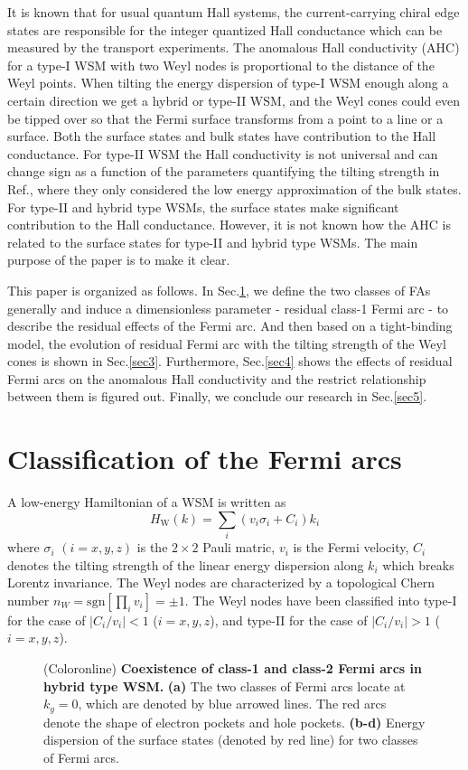 \documentclass[twocolumn,superscriptaddress]{revtex4}%
\begin{document}
It is known that for usual quantum Hall systems, the current-carrying chiral
edge states are responsible for the integer quantized Hall conductance which
can be measured by the transport experiments\cite{Halperin1982,Streda1984}. The
anomalous Hall conductivity (AHC) for a type-I WSM with two Weyl nodes is
proportional to the distance of the Weyl points\cite{RanY2011}. When tilting
the energy dispersion of type-I WSM enough along a certain direction we get a hybrid or type-II WSM, and the Weyl cones could even be tipped over so that the Fermi surface
transforms from a point to a line or a surface. Both the surface states and
bulk states have contribution to the Hall conductance. For type-II WSM the Hall conductivity is not universal and can change
sign as a function of the parameters quantifying the tilting strength in
Ref.\cite{typeII2016}, where they only considered the low energy approximation
of the bulk states. For type-II and hybrid type WSMs, the surface states make significant contribution to the Hall conductance. However, it is not known
how the AHC is related to the surface states for type-II and hybrid type WSMs.
The main purpose of the paper is to make it clear.

This paper is organized as follows. In Sec.\ref{Sec2},  we define the two classes of FAs generally and induce a dimensionless parameter - residual class-1 Fermi arc - to describe the residual effects of the Fermi arc. And then based on a tight-binding model, the evolution of residual Fermi arc with the tilting strength of the Weyl cones is shown in Sec.\ref{sec3}. Furthermore, Sec.\ref{sec4}  shows the effects of residual Fermi arcs on the anomalous Hall conductivity and the restrict relationship between them is figured out. Finally, we conclude our research in Sec.\ref{sec5}.

\section{Classification of the Fermi arcs}\label{Sec2}
A low-energy Hamiltonian of a WSM is written as
\begin{equation}
H_{\mathrm{W}}(k)=\sum_{i}(v_{i}\sigma_{i}+C_{i})k_{i}\label{HW}%
\end{equation}
where $\sigma_{i}$ $(i=x,y,z)$ is the $2\times2$ Pauli matric, $v_{i}$ is
the Fermi velocity, $C_{i}$ denotes the tilting strength of the linear energy
dispersion along $k_{i}$ which breaks Lorentz invariance. The Weyl nodes are
characterized by a topological Chern number $n_{W}=\mathrm{sgn}[\prod_{i}%
v_{i}]=\pm1$. The Weyl nodes have been classified into type-I for the case of
$|C_{i}/v_{i}|<1$ ($i=x,y,z$), and type-II for the case of $|C_{i}/v_{i}|>1$
($i=x,y,z$). \begin{figure}[t]
\caption{(Coloronline)
\textbf{Coexistence of class-1 and class-2 Fermi arcs in hybrid type WSM.}
\textbf{(a)} The two classes of Fermi arcs locate at $k_{y}=0$, which are denoted by blue
arrowed lines. The red arcs denote the shape of electron pockets and hole
pockets. \textbf{(b-d)} Energy dispersion of the surface states (denoted by
red line) for two classes of Fermi arcs.}%
\label{Espectrum}%
\end{figure}
\end{document}
